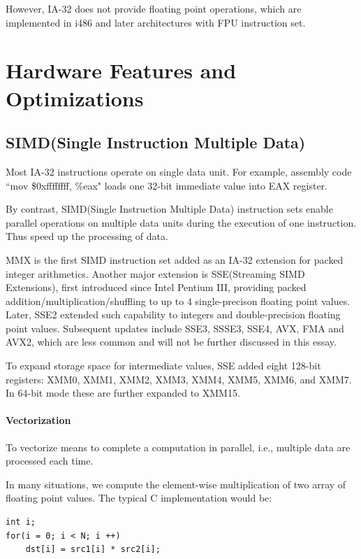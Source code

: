 \documentclass[a4paper]{report}
\begin{document}
	However, IA-32 does not provide floating point operations, which are implemented in i486 and later architectures with FPU instruction set.

\section{Hardware Features and Optimizations} \indent

\subsection{SIMD(Single Instruction Multiple Data)} \indent

	Most IA-32 instructions operate on single data unit. For example, assembly code ``mov \$0xffffffff, \%eax" loads one 32-bit immediate value into EAX register.
	
	By contrast, SIMD(Single Instruction Multiple Data) instruction sets enable parallel operations on multiple data units during the execution of one instruction. Thus speed up the processing of data.

	MMX is the first SIMD instruction set added as an IA-32 extension for packed integer arithmetics. Another major extension is SSE(Streaming SIMD Extensions), first introduced since Intel Pentium III, providing packed addition/multiplication/shuffling to up to 4 single-precison floating point values. Later, SSE2 extended such capability to integers and double-precision floating point values. Subsequent updates include SSE3, SSSE3, SSE4, AVX, FMA and AVX2, which are less common and will not be further discussed in this essay.

	To expand storage space for intermediate values, SSE added eight 128-bit registers: XMM0, XMM1, XMM2, XMM3, XMM4, XMM5, XMM6, and XMM7. In 64-bit mode these are further expanded to XMM15. \cite{inteldev}

\paragraph{Vectorization} \indent \bigskip

	To vectorize means to complete a computation in parallel, i.e., multiple data are processed each time.
	
	In many situations, we compute the element-wise multiplication of two array of floating point values. The typical C implementation would be:
	
        \lstset{language = c, tabsize = 4}
        \begin{lstlisting}
int i;
for(i = 0; i < N; i ++)
	dst[i] = src1[i] * src2[i];
        \end{lstlisting}
\end{document}
